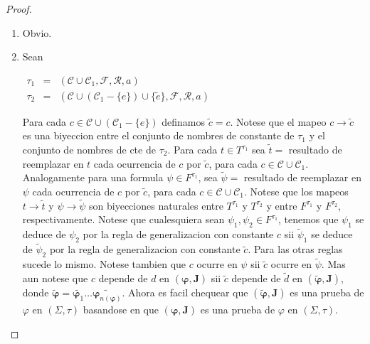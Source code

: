   \begin{proof}
    \begin{enumerate}
      \item Obvio.
      \item Sean

      $\displaystyle \begin{array}{rcl} \tau _{1} & =& (\mathcal{C}\cup \mathcal{C}_{1},\mathcal{F},\mathcal{R},a) \\ \tau _{2} & =& (\mathcal{C}\cup (\mathcal{C}_{1}-\{e\})\cup \{\tilde{e}\}, \mathcal{F},\mathcal{R},a) \end{array} $

      Para cada $c\in \mathcal{C}\cup (\mathcal{C}_{1}-\{e\})$ definamos $\tilde{c} =c$. Notese que el mapeo $c\rightarrow \tilde{c}$ es una biyeccion entre el conjunto de nombres de constante de $\tau _{1}$ y el conjunto de nombres de cte de $\tau _{2}$. Para cada $t\in T^{\tau _{1}}$ sea $\tilde{t}=$ resultado de reemplazar en $t$ cada ocurrencia de $c$ por $\tilde{c}$, para cada $c\in \mathcal{C}\cup \mathcal{C}_{1}$. Analogamente para una formula $ \psi \in F^{\tau _{1}}$, sea $\tilde{\psi}=$ resultado de reemplazar en $ \psi $ cada ocurrencia de $c$ por $\tilde{c}$, para cada $c\in \mathcal{C} \cup \mathcal{C}_{1}$. Notese que los mapeos $t\rightarrow \tilde{t}$ y $ \psi \rightarrow \tilde{\psi}$ son biyecciones naturales entre $T^{\tau _{1}} $ y $T^{\tau _{2}}$ y entre $F^{\tau _{1}}$ y $F^{\tau _{2}}$, respectivamente. Notese que cualesquiera sean $\psi_{1},\psi_{2}\in F^{\tau _{1}}$, tenemos que $\psi_{1}$ se deduce de $\psi_{2}$ por la regla de generalizacion con constante $c$ sii $\tilde{\psi}_{1}$ se deduce de $\tilde{\psi}_{2}$ por la regla de generalizacion con constante $\tilde{c} $. Para las otras reglas sucede lo mismo. Notese tambien que $c$ ocurre en $ \psi $ sii $\tilde{c}$ ocurre en $\tilde{\psi}.$ Mas aun notese que $c$ depende de $d$ en $(\mathbf{\varphi },\mathbf{J})$ sii $\tilde{c}$ depende de $\tilde{d}$ en $(\mathbf{\tilde{\varphi}},\mathbf{J})$, donde $\mathbf{ \tilde{\varphi}}=\widetilde{\mathbf{\varphi }_{1}}\dotsc\widetilde{\mathbf{ \varphi }_{n(\mathbf{\varphi })}}$. Ahora es facil chequear que $(\mathbf{ \tilde{\varphi}},\mathbf{J})$ es una prueba de $\varphi$ en $(\Sigma, \tau) $ basandose en que $(\mathbf{\varphi },\mathbf{J})$ es una prueba de $\varphi$ en $(\Sigma, \tau)$.
    \end{enumerate}
  \end{proof}

